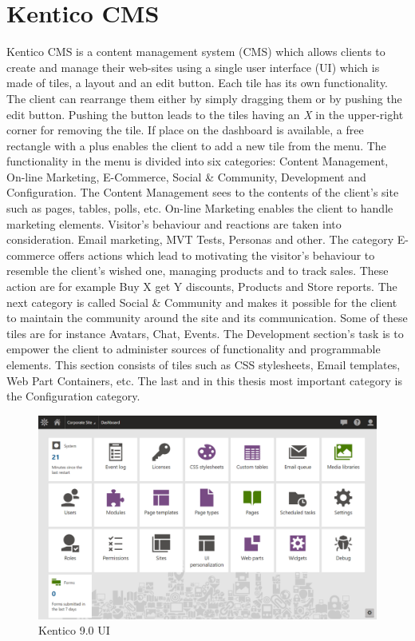 \section{Kentico CMS} \label{analysisKenticoCMS}
Kentico CMS is a content management system (CMS) which allows clients to create and manage their web-sites using a single user interface (UI) which is made of tiles, a layout and an edit button. Each tile has its own functionality. The client can rearrange them either by simply dragging them or by pushing the edit button. Pushing the button leads to the tiles having an \textit{X} in the upper-right corner for removing the tile. If place on the dashboard is available, a free rectangle with a plus enables the client to add a new tile from the menu. The functionality in the menu is divided into six categories: Content Management, On-line Marketing, E-Commerce, Social \& Community, Development and Configuration. The Content Management sees to the contents of the client's site such as pages, tables, polls, etc. On-line Marketing enables the client to handle marketing elements. Visitor's behaviour and reactions are taken into consideration. Email marketing, MVT Tests, Personas and other. The category E-commerce offers actions which lead to motivating the visitor's behaviour to resemble the client's wished one, managing products and to track sales. These action are for example Buy X get Y discounts, Products and Store reports. The next category is called Social \& Community and makes it possible for the client to maintain the community around the site and its communication. Some of these tiles are for instance Avatars, Chat, Events. The Development section's task is to empower the client to administer sources of functionality and programmable elements. This section consists of tiles such as CSS stylesheets, Email templates, Web Part Containers, etc. The last and in this thesis most important category is the Configuration category.  
\begin{figure}[ht!]
  \centering
  \includegraphics[width=\textwidth]{Images/Kentico9.png}
  \caption{Kentico 9.0 UI}
  \label{kentico9.0UI}
\end{figure} 

